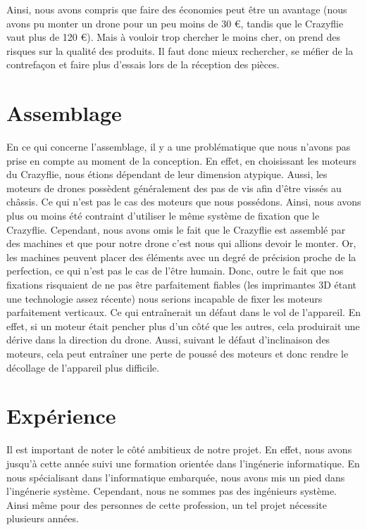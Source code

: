 \documentclass[a4paper,10pt]{report}
\begin{document}
      Ainsi, nous avons compris que faire des économies peut être un avantage 
(nous avons pu monter un drone pour un peu moins de 30 \euro, tandis que le 
Crazyflie vaut plus de 120 \euro). Mais à vouloir trop chercher le moins cher, 
on prend des risques sur la qualité des produits. Il faut donc mieux 
rechercher, se méfier de la contrefaçon  et faire plus d'essais lors de la 
réception des pièces.
    
    \section{Assemblage}
      En ce qui concerne l'assemblage, il y a une problématique que nous 
n'avons pas prise en compte au moment de la conception. En effet, en 
choisissant les moteurs du Crazyflie, nous étions dépendant de leur dimension 
atypique. Aussi, les moteurs de drones possèdent généralement des pas de vis 
afin d'être vissés au châssis. Ce qui n'est pas le cas des moteurs que nous 
possédons. Ainsi, nous avons plus ou moins été contraint d'utiliser le même 
système de fixation que le Crazyflie. Cependant, nous avons omis le fait que le 
Crazyflie est assemblé par des machines et que pour notre drone c'est nous qui 
allions devoir le monter. Or, les machines peuvent placer des éléments avec un 
degré de précision proche de la perfection, ce qui n'est pas le cas de l'être 
humain. Donc, outre le fait que nos fixations risquaient de ne pas être 
parfaitement fiables (les imprimantes 3D étant une technologie assez récente) 
nous serions incapable de fixer les moteurs parfaitement verticaux. Ce qui 
entraînerait un défaut dans le vol de l'appareil. En effet, si un moteur était 
pencher plus d'un côté que les autres, cela produirait une dérive dans la 
direction du drone. Aussi, suivant le défaut d'inclinaison des moteurs, cela 
peut entraîner une perte de poussé des moteurs et donc rendre le décollage de 
l'appareil plus difficile.
    
    \section{Expérience}
      Il est important de noter le côté ambitieux de notre projet. En effet, 
nous avons jusqu'à cette année suivi une formation orientée dans l'ingénerie 
informatique. En nous spécialisant dans l'informatique embarquée, nous avons 
mis un pied dans l'ingénerie système. Cependant, nous ne sommes pas des 
ingénieurs système. Ainsi même pour des personnes de cette profession, un tel 
projet nécessite plusieurs années.
\end{document}
